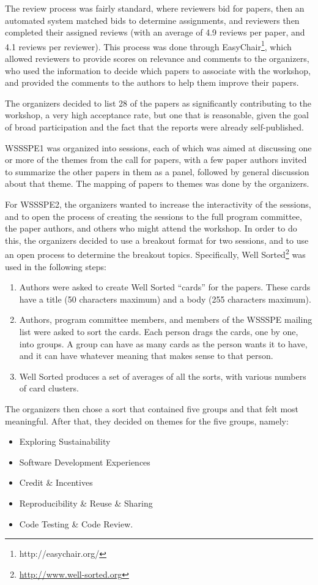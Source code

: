 \documentclass[11pt, oneside]{amsart}
\begin{document}
The review process was fairly standard, where reviewers bid for papers, then an
automated system matched bids to determine assignments, and reviewers then
completed their assigned reviews (with an average of 4.9 reviews per paper, and
4.1 reviews per reviewer). This process was done through
EasyChair\footnote{http://easychair.org/}, which allowed reviewers to provide
scores on relevance and comments to the organizers, who used the information to
decide which papers to associate with the workshop, and provided the comments to
the authors to help them improve their papers.

The organizers decided to list 28 of the papers as significantly contributing to
the workshop, a very high acceptance rate, but one that is reasonable, given the
goal of broad participation and the fact that the reports were already
self-published.

WSSSPE1 was organized into sessions, each of which was aimed at discussing one
or more of the themes from the call for papers, with a few paper authors invited
to summarize the other papers in them as a panel, followed by general
discussion about that theme. The mapping of papers to themes was done by the
organizers.

For WSSSPE2, the organizers wanted to increase the interactivity of the
sessions, and to open the process of creating the sessions to the full program
committee, the paper authors, and others who might attend the workshop. In order
to do this, the organizers decided to use a breakout format for two sessions,
and to use an open process to determine the breakout topics. Specifically, Well
Sorted\footnote{\url{http://www.well-sorted.org}} was used in the following
steps:
\begin{enumerate}
\item Authors were asked to create Well Sorted ``cards'' for the papers. These
cards have a title (50 characters maximum) and a body (255 characters maximum).
\item Authors, program committee members, and members of the WSSSPE mailing list
were asked to sort the cards. Each person drags the cards, one by one, into
groups. A group can have as many cards as the person wants it to have, and it
can have whatever meaning that makes sense to that person.
\item Well Sorted  produces a set of averages of all the sorts, with various
numbers of card clusters.
\end{enumerate}

The organizers then chose a sort that contained five groups and that felt most
meaningful. After that, they decided on themes for the five groups, namely:
\begin{itemize}
\item Exploring Sustainability
\item Software Development Experiences
\item Credit \& Incentives
\item Reproducibility \& Reuse \& Sharing
\item Code Testing \& Code Review.
\end{itemize}
\end{document}
